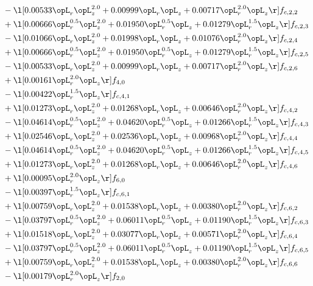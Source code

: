\begin{alignat}{2}
& - \l[  0.00533 \opL_r \opL_z^{2.0} +  0.00999 \opL_r \opL_z +  0.00717 \opL_r^{2.0} \opL_z  \r] f_{c,2,2} \nonumber \\ 
& + \l[  0.00666 \opL_r^{0.5} \opL_z^{2.0} +  0.01950 \opL_r^{0.5} \opL_z +  0.01279 \opL_r^{1.5} \opL_z  \r] f_{c,2,3} \nonumber \\ 
& - \l[  0.01066 \opL_r \opL_z^{2.0} +  0.01998 \opL_r \opL_z +  0.01076 \opL_r^{2.0} \opL_z  \r] f_{c,2,4} \nonumber \\ 
& + \l[  0.00666 \opL_r^{0.5} \opL_z^{2.0} +  0.01950 \opL_r^{0.5} \opL_z +  0.01279 \opL_r^{1.5} \opL_z  \r] f_{c,2,5} \nonumber \\ 
& - \l[  0.00533 \opL_r \opL_z^{2.0} +  0.00999 \opL_r \opL_z +  0.00717 \opL_r^{2.0} \opL_z  \r] f_{c,2,6} \nonumber \\ 
& + \l[  0.00161 \opL_r^{2.0} \opL_z  \r] f_{4,0} \nonumber \\ 
& - \l[  0.00422 \opL_r^{1.5} \opL_z  \r] f_{c,4,1} \nonumber \\ 
& + \l[  0.01273 \opL_r \opL_z^{2.0} +  0.01268 \opL_r \opL_z +  0.00646 \opL_r^{2.0} \opL_z  \r] f_{c,4,2} \nonumber \\ 
& - \l[  0.04614 \opL_r^{0.5} \opL_z^{2.0} +  0.04620 \opL_r^{0.5} \opL_z +  0.01266 \opL_r^{1.5} \opL_z  \r] f_{c,4,3} \nonumber \\ 
& + \l[  0.02546 \opL_r \opL_z^{2.0} +  0.02536 \opL_r \opL_z +  0.00968 \opL_r^{2.0} \opL_z  \r] f_{c,4,4} \nonumber \\ 
& - \l[  0.04614 \opL_r^{0.5} \opL_z^{2.0} +  0.04620 \opL_r^{0.5} \opL_z +  0.01266 \opL_r^{1.5} \opL_z  \r] f_{c,4,5} \nonumber \\ 
& + \l[  0.01273 \opL_r \opL_z^{2.0} +  0.01268 \opL_r \opL_z +  0.00646 \opL_r^{2.0} \opL_z  \r] f_{c,4,6} \nonumber \\ 
& + \l[  0.00095 \opL_r^{2.0} \opL_z  \r] f_{6,0} \nonumber \\ 
& - \l[  0.00397 \opL_r^{1.5} \opL_z  \r] f_{c,6,1} \nonumber \\ 
& + \l[  0.00759 \opL_r \opL_z^{2.0} +  0.01538 \opL_r \opL_z +  0.00380 \opL_r^{2.0} \opL_z  \r] f_{c,6,2} \nonumber \\ 
& - \l[  0.03797 \opL_r^{0.5} \opL_z^{2.0} +  0.06011 \opL_r^{0.5} \opL_z +  0.01190 \opL_r^{1.5} \opL_z  \r] f_{c,6,3} \nonumber \\ 
& + \l[  0.01518 \opL_r \opL_z^{2.0} +  0.03077 \opL_r \opL_z +  0.00571 \opL_r^{2.0} \opL_z  \r] f_{c,6,4} \nonumber \\ 
& - \l[  0.03797 \opL_r^{0.5} \opL_z^{2.0} +  0.06011 \opL_r^{0.5} \opL_z +  0.01190 \opL_r^{1.5} \opL_z  \r] f_{c,6,5} \nonumber \\ 
& + \l[  0.00759 \opL_r \opL_z^{2.0} +  0.01538 \opL_r \opL_z +  0.00380 \opL_r^{2.0} \opL_z  \r] f_{c,6,6} \nonumber \\ 
& - \l[  0.00179 \opL_r^{2.0} \opL_z  \r] f_{2,0} \nonumber \\ 
\end{alignat} 


